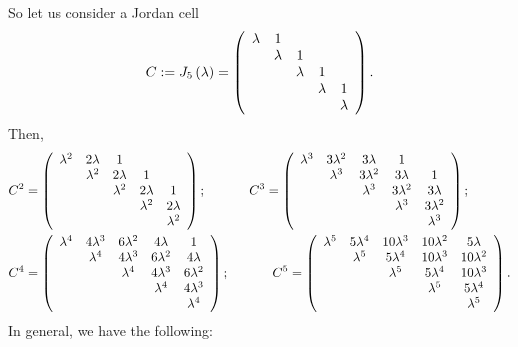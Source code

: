 \documentclass[numbers=enddot,12pt,final,onecolumn,notitlepage]{scrartcl}%
\numberwithin{exer}{subsection}
\theoremstyle{definition}
\begin{document}
So let us consider a Jordan cell
\[
C:=J_{5}\left(  \lambda\right)  =\left(
\begin{array}
[c]{ccccc}%
\lambda & 1 &  &  & \\
& \lambda & 1 &  & \\
&  & \lambda & 1 & \\
&  &  & \lambda & 1\\
&  &  &  & \lambda
\end{array}
\right)  .
\]
Then,%
\begin{align*}
C^{2}  &  =\left(
\begin{array}
[c]{ccccc}%
\lambda^{2} & 2\lambda & 1 &  & \\
& \lambda^{2} & 2\lambda & 1 & \\
&  & \lambda^{2} & 2\lambda & 1\\
&  &  & \lambda^{2} & 2\lambda\\
&  &  &  & \lambda^{2}%
\end{array}
\right)  ;\ \ \ \ \ \ \ \ \ \ C^{3}=\left(
\begin{array}
[c]{ccccc}%
\lambda^{3} & 3\lambda^{2} & 3\lambda & 1 & \\
& \lambda^{3} & 3\lambda^{2} & 3\lambda & 1\\
&  & \lambda^{3} & 3\lambda^{2} & 3\lambda\\
&  &  & \lambda^{3} & 3\lambda^{2}\\
&  &  &  & \lambda^{3}%
\end{array}
\right)  ;\\
C^{4}  &  =\left(
\begin{array}
[c]{ccccc}%
\lambda^{4} & 4\lambda^{3} & 6\lambda^{2} & 4\lambda & 1\\
& \lambda^{4} & 4\lambda^{3} & 6\lambda^{2} & 4\lambda\\
&  & \lambda^{4} & 4\lambda^{3} & 6\lambda^{2}\\
&  &  & \lambda^{4} & 4\lambda^{3}\\
&  &  &  & \lambda^{4}%
\end{array}
\right)  ;\ \ \ \ \ \ \ \ \ \ C^{5}=\left(
\begin{array}
[c]{ccccc}%
\lambda^{5} & 5\lambda^{4} & 10\lambda^{3} & 10\lambda^{2} & 5\lambda\\
& \lambda^{5} & 5\lambda^{4} & 10\lambda^{3} & 10\lambda^{2}\\
&  & \lambda^{5} & 5\lambda^{4} & 10\lambda^{3}\\
&  &  & \lambda^{5} & 5\lambda^{4}\\
&  &  &  & \lambda^{5}%
\end{array}
\right)  .
\end{align*}
In general, we have the following:
\end{document}
